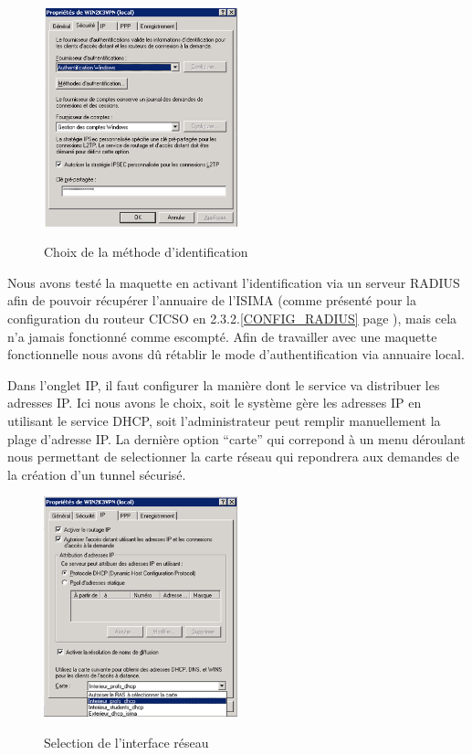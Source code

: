 \begin{figure}[H]
	\begin{center}
		\includegraphics[width=0.50\textwidth]{partie_2/screen_windows/secu_vpn.PNG}\\
	\end{center}
	\caption{Choix de la méthode d'identification}
	\label{VPN_AUTHENTIFICATION}
\end{figure}

Nous avons testé la maquette en activant l'identification via un serveur RADIUS afin de pouvoir récupérer l'annuaire de l'ISIMA (comme présenté pour la configuration du routeur CICSO en 2.3.2.\ref{CONFIG_RADIUS} page \pageref{CONFIG_RADIUS}), mais cela n'a jamais fonctionné comme escompté. Afin de travailler avec une maquette fonctionnelle nous avons dû rétablir le mode d'authentification via annuaire local.

Dans l'onglet IP, il faut configurer la manière dont le service va distribuer les adresses IP. Ici nous avons le choix, soit le système gère les adresses IP en utilisant le service DHCP, soit l'administrateur peut remplir manuellement la plage d'adresse IP. La dernière option ``carte'' qui correpond à un menu déroulant nous permettant de selectionner la carte réseau qui repondrera aux demandes de la création d'un tunnel sécurisé. 

\begin{figure}[H]
	\begin{center}
		\includegraphics[width=0.50\textwidth]{partie_2/screen_windows/choix_carte.PNG}\\
	\end{center}
	\caption{Selection de l'interface réseau}
	\label{VPN_CARTE_ECOUTE}
\end{figure}

